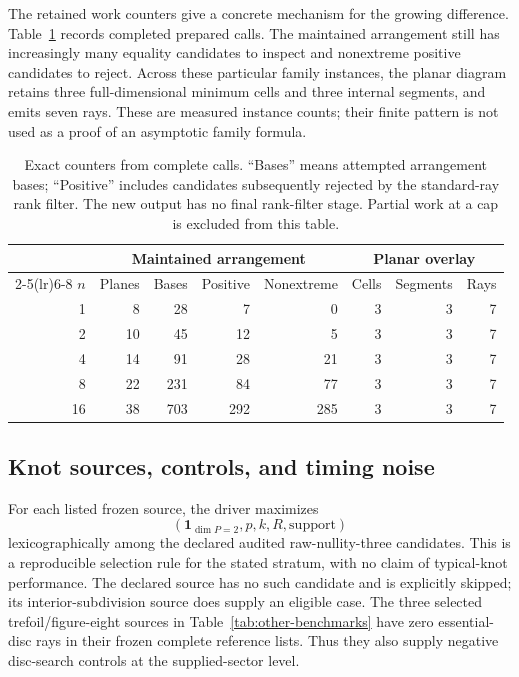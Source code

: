The retained work counters give a concrete mechanism for the growing
difference. Table~\ref{tab:family-work} records completed prepared
calls. The maintained arrangement still has increasingly many equality
candidates to inspect and nonextreme positive candidates to reject.
Across these particular family instances, the planar diagram retains
three full-dimensional minimum cells and three internal segments, and
emits seven rays. These are measured instance counts; their finite
pattern is not used as a proof of an asymptotic family formula.

\begin{table}[htbp]
\centering\small
\begin{tabular*}{\linewidth}{@{\extracolsep{\fill}}rrrrrrrr@{}}
\toprule
& \multicolumn{4}{c}{Maintained arrangement} & \multicolumn{3}{c}{Planar overlay}\\
\cmidrule(lr){2-5}\cmidrule(lr){6-8}
$n$ & Planes & Bases & Positive & Nonextreme & Cells & Segments & Rays\\
\midrule
1 & 8 & 28 & 7 & 0 & 3 & 3 & 7\\
2 & 10 & 45 & 12 & 5 & 3 & 3 & 7\\
4 & 14 & 91 & 28 & 21 & 3 & 3 & 7\\
8 & 22 & 231 & 84 & 77 & 3 & 3 & 7\\
16 & 38 & 703 & 292 & 285 & 3 & 3 & 7\\
\bottomrule
\end{tabular*}
\caption{Exact counters from complete calls. ``Bases'' means attempted
arrangement bases; ``Positive'' includes candidates subsequently
rejected by the standard-ray rank filter. The new output has no final
rank-filter stage. Partial work at a cap is excluded from this table.}
\label{tab:family-work}
\end{table}

\subsection{Knot sources, controls, and timing noise}

For each listed frozen source, the driver maximizes
\[
 (\mathbf{1}_{\dim P=2},p,k,R,\text{support})
\]
lexicographically among the declared audited raw-nullity-three candidates.
This is a reproducible
selection rule for the stated stratum, with no claim of typical-knot
performance. The declared source  has no such
candidate and is explicitly skipped; its interior-subdivision source
does supply an eligible case. The three selected trefoil/figure-eight
sources in Table~\ref{tab:other-benchmarks} have zero essential-disc
rays in their frozen complete reference lists. Thus they also supply
negative disc-search controls at the supplied-sector level.

